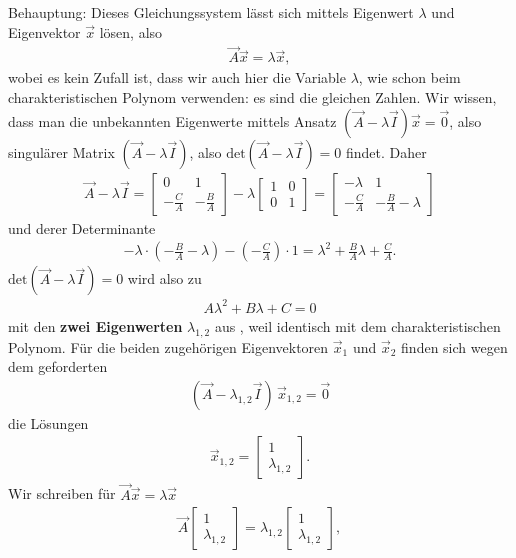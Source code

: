 Behauptung:
Dieses Gleichungssystem lässt sich mittels Eigenwert $\lambda$ und
Eigenvektor $\vec{x}$ lösen, also
\begin{align}
\vec{A} \vec{x} = \lambda \vec{x},
\end{align}
wobei es kein Zufall ist, dass wir auch hier die Variable $\lambda$, wie schon
beim charakteristischen Polynom verwenden: es sind die gleichen Zahlen.
Wir wissen, dass man die unbekannten Eigenwerte mittels Ansatz
$(\vec{A} - \lambda \vec{I})\vec{x} = \vec{0}$, also singulärer Matrix
$(\vec{A} - \lambda \vec{I})$, also $\mathrm{det}(\vec{A} - \lambda \vec{I})=0$
findet.
%
Daher
\begin{align}
\vec{A} - \lambda \vec{I} =
\begin{bmatrix}
0 & 1 \\ -\frac{C}{A} & -\frac{B}{A}
\end{bmatrix}
-\lambda
\begin{bmatrix}
1 & 0 \\ 0 & 1
\end{bmatrix}
=
\begin{bmatrix}
-\lambda & 1 \\ -\frac{C}{A} & -\frac{B}{A} - \lambda
\end{bmatrix}
\end{align}
und derer Determinante
\begin{align}
-\lambda \cdot (-\frac{B}{A} - \lambda) - (-\frac{C}{A})\cdot 1 = \lambda^2 + \frac{B}{A} \lambda + \frac{C}{A}.
\end{align}
%
$\mathrm{det}(\vec{A} - \lambda \vec{I})=0$ wird also zu
\begin{align}
A \lambda^2 + B \lambda + C = 0
\end{align}
mit den \textbf{zwei Eigenwerten} $\lambda_{1,2}$ aus ,
weil identisch mit dem charakteristischen Polynom.
%
Für die beiden zugehörigen Eigenvektoren $\vec{x}_{1}$ und $\vec{x}_{2}$ finden sich wegen
dem geforderten
\begin{align}
(\vec{A} - \lambda_{1,2} \vec{I}) \, \vec{x}_{1,2} = \vec{0}
\end{align}
die Lösungen
\begin{align}
\vec{x}_{1,2} =
\begin{bmatrix}
1 \\ \lambda_{1,2}
\end{bmatrix}.
\end{align}
%
Wir schreiben für $\vec{A} \vec{x} = \lambda \vec{x}$
%
\begin{align}
\vec{A}
\begin{bmatrix}
1 \\ \lambda_{1,2}
\end{bmatrix} = \lambda_{1,2}
\begin{bmatrix}
1 \\ \lambda_{1,2}
\end{bmatrix},
\end{align}
